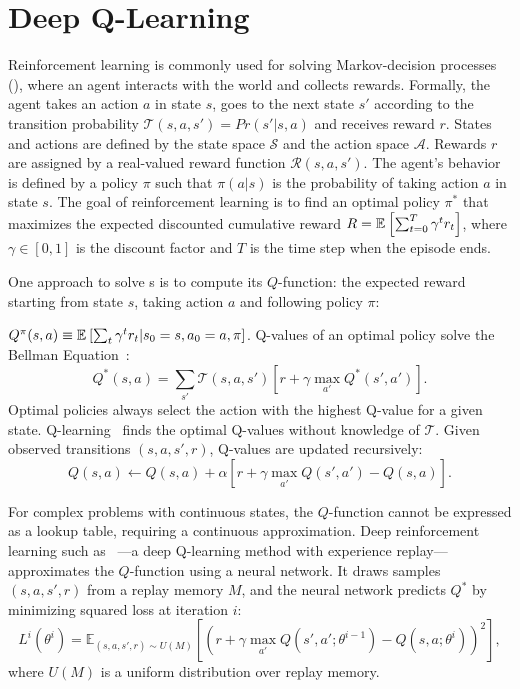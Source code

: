 \section{Deep Q-Learning}
\label{sec:background}

Reinforcement learning is commonly used for solving Markov-decision
processes (), where an agent interacts with the world and
collects rewards.  Formally, the agent takes an action $a$ in state
$s$, goes to the next state $s'$ according to the transition
probability $\mathcal{T}(s,a,s')=Pr(s'|s,a)$ and receives reward $r$.
States and actions are defined by the state space $\mathcal{S}$ and
the action space $\mathcal{A}$.  Rewards $r$ are assigned by a real-valued
reward function $\mathcal{R}(s, a, s')$.  The agent's behavior is
defined by a policy $\pi$ such that $\pi(a|s)$ is the probability of
taking action $a$ in state $s$.  The goal of reinforcement learning is
to find an optimal policy $\pi^\ast$ that maximizes the expected
discounted cumulative
reward 
$R = \mathbb{E}_{}\left[ \sum_{t=0}^T\gamma^t r_t \right]$, where $\gamma \in [0, 1]$ is the
discount factor and $T$ is the time step when the episode ends.

One approach to solve s is to compute its $Q$-function:
the expected reward starting from state $s$, taking action $a$ and following policy $\pi$:

$Q^\pi(s,a) \equiv \mathbb{E}_{}\left[ \sum_{t} \gamma^t r_t | s_0=s, a_0=a, \pi \right]$.  Q-values
of an optimal policy solve the Bellman Equation~\cite{rl-intro}:
\begin{equation*}
\label{eqn:qiteration}
Q^\ast(s,a) = \sum_{s'}\mathcal{T}(s,a,s')\left [ r + \gamma \max_{a'} Q^\ast(s', a')\right ].
\end{equation*}
Optimal policies always select the action with the highest Q-value for a given
state.  Q-learning~\cite{qlearning,rl-intro}
finds the optimal Q-values without knowledge of $\mathcal{T}$.
Given observed transitions $(s, a, s', r)$, Q-values are updated recursively:
\begin{equation*}
\label{eqn:qlearning}
Q(s,a) \leftarrow Q(s,a) + \alpha\left [r + \gamma\max_{a'} Q(s', a') - Q(s,a)\right ].
\end{equation*}

For complex problems with continuous states, the $Q$-function cannot be
expressed as a lookup table, requiring a continuous approximation.  Deep
reinforcement learning such as \dqn{}~\cite{mnih-dqn-2015}---a deep Q-learning
method with experience replay---approximates the $Q$-function using a neural
network.  It draws samples $(s, a, s', r)$ from a replay memory $M$, and the
neural network predicts $Q^\ast$ by minimizing squared loss at iteration
$i$:
\begin{dmath*}
L^i(\theta^i) = \mathbb{E}_{(s, a, s', r) \sim U(M)} \left [ \left ( {r + \gamma\max_{a'}Q(s',a';\theta^{i-1})} - Q(s,a;\theta^i)\right ) ^2 \right ],
\end{dmath*}
where $U(M)$ is a uniform distribution over replay memory.

